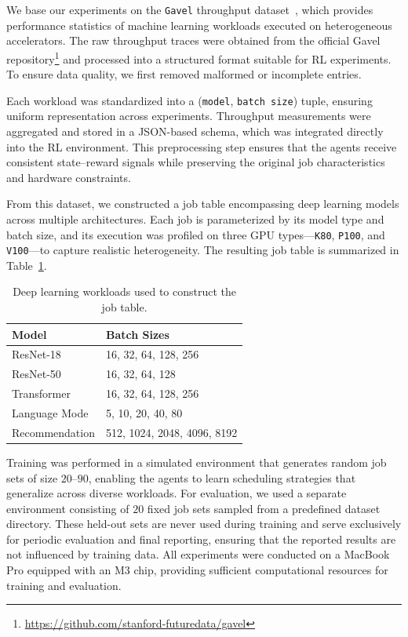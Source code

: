 \documentclass{article}
\begin{document}
We base our experiments on the \texttt{Gavel} throughput dataset~\cite{gavel}, which provides performance statistics of machine learning workloads executed on heterogeneous accelerators. The raw throughput traces were obtained from the official Gavel repository\footnote{\url{https://github.com/stanford-futuredata/gavel}} and processed into a structured format suitable for  RL experiments. To ensure data quality, we first removed malformed or incomplete entries.

Each workload was standardized into a (\texttt{model}, \texttt{batch size}) tuple, ensuring uniform representation across experiments. Throughput measurements were aggregated and stored in a JSON-based schema, which was integrated directly into the RL environment. This preprocessing step ensures that the agents receive consistent state–reward signals while preserving the original job characteristics and hardware constraints.

From this dataset, we constructed a job table encompassing deep learning models across multiple architectures. Each job is parameterized by its model type and batch size, and its execution was profiled on three GPU types—\texttt{K80}, \texttt{P100}, and \texttt{V100}—to capture realistic heterogeneity. The resulting job table is summarized in Table~\ref{tab:jobtable}.

\begin{table}[tb]
  \centering
  \caption{Deep learning workloads used to construct the job table.}
  \label{tab:jobtable}
  \begin{tabular}{ll}
    \toprule
    \textbf{Model} & \textbf{Batch Sizes} \\
    \midrule
    ResNet-18      & 16, 32, 64, 128, 256 \\
    ResNet-50      & 16, 32, 64, 128 \\
    Transformer    & 16, 32, 64, 128, 256 \\
    Language Mode  & 5, 10, 20, 40, 80 \\
    Recommendation & 512, 1024, 2048, 4096, 8192 \\
    \bottomrule
  \end{tabular}
\end{table}

Training was performed in a simulated environment that generates random job sets of size $20$–$90$, enabling the agents to learn scheduling strategies that generalize across diverse workloads. For evaluation, we used a separate environment consisting of $20$ fixed job sets sampled from a predefined dataset directory. These held-out sets are never used during training and serve exclusively for periodic evaluation and final reporting, ensuring that the reported results are not influenced by training data. All experiments were conducted on a MacBook Pro equipped with an M3 chip, providing sufficient computational resources for training and evaluation. 
\end{document}
